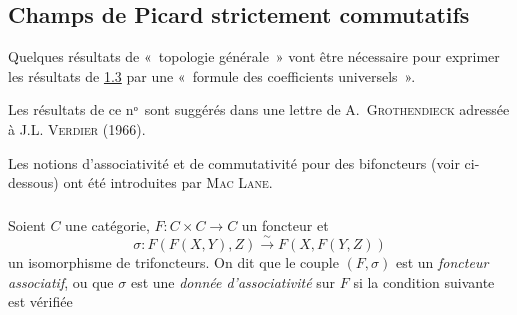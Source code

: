 \subsection{Champs de Picard strictement
  commutatifs}

Quelques résultats de « topologie générale » vont être nécessaire
pour exprimer les résultats de \hyperref[XVIII.subsec1.3]{1.3} par une « formule des
coefficients universels ».

Les résultats de ce nᵒ sont suggérés dans une lettre de
A.~\textsc{Grothendieck} adressée à J.L. \textsc{Verdier} (1966).

Les notions d'associativité et de commutativité pour des bifoncteurs
(voir ci-dessous) ont été introduites par \textsc{Mac Lane}.

\subsubsection{}
Soient $C$ une catégorie, $F:C\times C\rightarrow C$ un foncteur et
$$
\sigma:F(F(X,Y),Z)\xrightarrow{\sim} F(X,F(Y,Z))
$$
un isomorphisme de trifoncteurs. On dit que le couple $(F,\sigma)$ est
un \emph{foncteur associatif}, ou que $\sigma$ est une \emph{donnée
d'associativité} sur $F$ si la condition suivante est vérifiée

